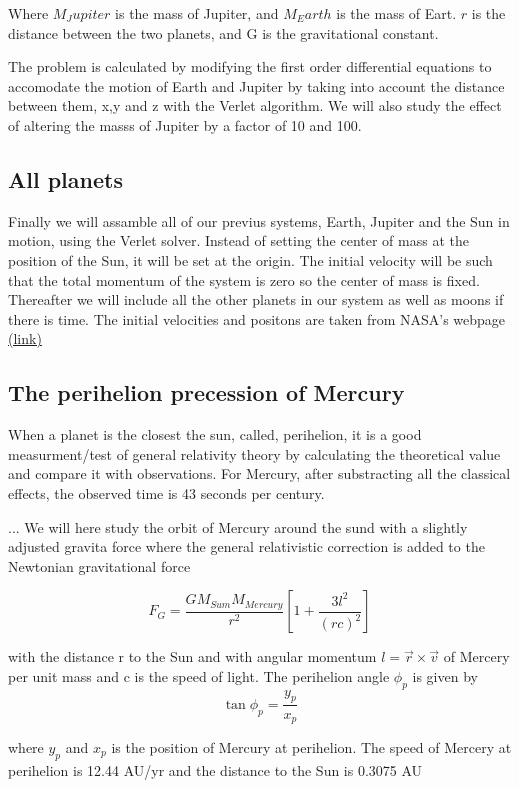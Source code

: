 \documentclass[../main.tex]{subfiles}
\begin{document}
Where $M_Jupiter$ is the mass of Jupiter, and $M_Earth$ is the mass of Eart. $r$ is the distance between the two planets, and G is the gravitational constant.

The problem is calculated by modifying the first order differential equations to accomodate the motion of Earth and Jupiter by taking into account the distance between them, x,y and z with the Verlet algorithm. We will also study the effect of altering the masss of Jupiter by a factor of 10 and 100.

\subsection{All planets}
 Finally we will assamble all of our previus systems, Earth, Jupiter and the Sun in motion, using the Verlet solver. Instead of setting the center of mass at the position of the Sun, it will be set at the origin. The initial velocity will be such that the total momentum of the system is zero so the center of mass is fixed. Thereafter we will include all the other planets in our system as well as moons if there is time. The initial velocities and positons are taken from NASA's webpage \href{http://ssd.jpl.nasa.gov/horizons.cgi#top}{(link)}

\subsection{The perihelion precession of Mercury }
When a planet is the closest the sun, called, perihelion, it is a good measurment/test of general relativity theory by calculating the theoretical value and compare it with observations. For Mercury, after substracting all the classical effects, the observed time is 43 seconds per century.

...
We will here study the orbit of Mercury around the sund with a slightly adjusted gravita force where the general relativistic correction is added to the Newtonian gravitational force

\begin{equation}
  F_G = \frac{GM_{Sum}M_{Mercury}}{r^2} \left[ 1+\frac {3l^2}{(rc)^2} \right]
\end{equation}

 with the distance r to the Sun and with angular momentum $l = \vec r \times \vec v$ of Mercery per unit mass and c is the speed of light. The perihelion angle $\phi_p$ is given by
$$\tan \phi_p = \frac{y_p}{x_p}$$

where $y_p$ and $x_p$ is the position of Mercury at perihelion. The speed of Mercery at perihelion is 12.44 AU/yr and the distance to the Sun is 0.3075 AU
\end{document}
